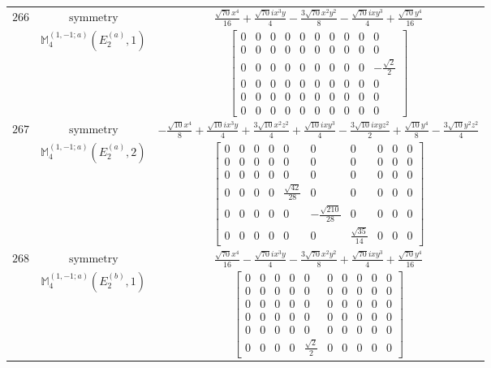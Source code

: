 \documentclass[fleqn,8pt,landscape]{jsarticle}
\begin{document}
\begin{longtable}{ccc}
$ 266 $ & $ \text{symmetry} $ & $ \frac{\sqrt{70} x^{4}}{16} + \frac{\sqrt{70} i x^{3} y}{4} - \frac{3 \sqrt{70} x^{2} y^{2}}{8} - \frac{\sqrt{70} i x y^{3}}{4} + \frac{\sqrt{70} y^{4}}{16} $ \\
$  $ & $ \mathbb{M}_{4}^{(1,-1;a)}(E_{2}^{(a)},1) $ & $ \begin{bmatrix} 0 & 0 & 0 & 0 & 0 & 0 & 0 & 0 & 0 & 0 \\ 0 & 0 & 0 & 0 & 0 & 0 & 0 & 0 & 0 & 0 \\ 0 & 0 & 0 & 0 & 0 & 0 & 0 & 0 & 0 & - \frac{\sqrt{2}}{2} \\ 0 & 0 & 0 & 0 & 0 & 0 & 0 & 0 & 0 & 0 \\ 0 & 0 & 0 & 0 & 0 & 0 & 0 & 0 & 0 & 0 \\ 0 & 0 & 0 & 0 & 0 & 0 & 0 & 0 & 0 & 0 \end{bmatrix} $ \\ \hline
$ 267 $ & $ \text{symmetry} $ & $ - \frac{\sqrt{10} x^{4}}{8} + \frac{\sqrt{10} i x^{3} y}{4} + \frac{3 \sqrt{10} x^{2} z^{2}}{4} + \frac{\sqrt{10} i x y^{3}}{4} - \frac{3 \sqrt{10} i x y z^{2}}{2} + \frac{\sqrt{10} y^{4}}{8} - \frac{3 \sqrt{10} y^{2} z^{2}}{4} $ \\
$  $ & $ \mathbb{M}_{4}^{(1,-1;a)}(E_{2}^{(a)},2) $ & $ \begin{bmatrix} 0 & 0 & 0 & 0 & 0 & 0 & 0 & 0 & 0 & 0 \\ 0 & 0 & 0 & 0 & 0 & 0 & 0 & 0 & 0 & 0 \\ 0 & 0 & 0 & 0 & 0 & 0 & 0 & 0 & 0 & 0 \\ 0 & 0 & 0 & 0 & \frac{\sqrt{42}}{28} & 0 & 0 & 0 & 0 & 0 \\ 0 & 0 & 0 & 0 & 0 & - \frac{\sqrt{210}}{28} & 0 & 0 & 0 & 0 \\ 0 & 0 & 0 & 0 & 0 & 0 & \frac{\sqrt{35}}{14} & 0 & 0 & 0 \end{bmatrix} $ \\ \hline
$ 268 $ & $ \text{symmetry} $ & $ \frac{\sqrt{70} x^{4}}{16} - \frac{\sqrt{70} i x^{3} y}{4} - \frac{3 \sqrt{70} x^{2} y^{2}}{8} + \frac{\sqrt{70} i x y^{3}}{4} + \frac{\sqrt{70} y^{4}}{16} $ \\
$  $ & $ \mathbb{M}_{4}^{(1,-1;a)}(E_{2}^{(b)},1) $ & $ \begin{bmatrix} 0 & 0 & 0 & 0 & 0 & 0 & 0 & 0 & 0 & 0 \\ 0 & 0 & 0 & 0 & 0 & 0 & 0 & 0 & 0 & 0 \\ 0 & 0 & 0 & 0 & 0 & 0 & 0 & 0 & 0 & 0 \\ 0 & 0 & 0 & 0 & 0 & 0 & 0 & 0 & 0 & 0 \\ 0 & 0 & 0 & 0 & 0 & 0 & 0 & 0 & 0 & 0 \\ 0 & 0 & 0 & 0 & \frac{\sqrt{2}}{2} & 0 & 0 & 0 & 0 & 0 \end{bmatrix} $ \\ \hline

\end{longtable}
\end{document}
